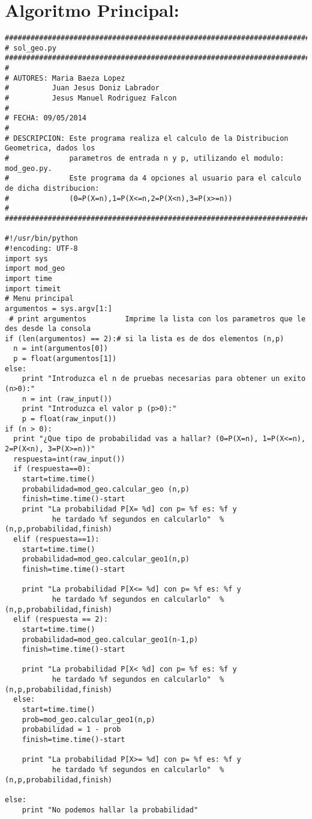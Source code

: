 \section{Algoritmo Principal:}
\label{Apendice1:XXX}

\begin{center}
\begin{footnotesize}
\begin{verbatim}
###################################################################################
# sol_geo.py
###################################################################################
#
# AUTORES: Maria Baeza Lopez
#          Juan Jesus Doniz Labrador
#          Jesus Manuel Rodriguez Falcon
#
# FECHA: 09/05/2014
#
# DESCRIPCION: Este programa realiza el calculo de la Distribucion Geometrica, dados los
#			   parametros de entrada n y p, utilizando el modulo: mod_geo.py.
#              Este programa da 4 opciones al usuario para el calculo de dicha distribucion:
#			   (0=P(X=n),1=P(X<=n,2=P(X<n),3=P(x>=n))
#
###################################################################################

#!/usr/bin/python
#!encoding: UTF-8
import sys
import mod_geo
import time
import timeit
# Menu principal
argumentos = sys.argv[1:]
 # print argumentos         Imprime la lista con los parametros que le des desde la consola
if (len(argumentos) == 2):# si la lista es de dos elementos (n,p)
  n = int(argumentos[0])
  p = float(argumentos[1])
else:
    print "Introduzca el n de pruebas necesarias para obtener un exito (n>0):"
    n = int (raw_input())
    print "Introduzca el valor p (p>0):"
    p = float(raw_input())
if (n > 0):
  print "¿Que tipo de probabilidad vas a hallar? (0=P(X=n), 1=P(X<=n), 2=P(X<n), 3=P(X>=n))"
  respuesta=int(raw_input())
  if (respuesta==0):
    start=time.time()
    probabilidad=mod_geo.calcular_geo (n,p)
    finish=time.time()-start
    print "La probabilidad P[X= %d] con p= %f es: %f y 
           he tardado %f segundos en calcularlo"  %(n,p,probabilidad,finish)
  elif (respuesta==1):
    start=time.time()
    probabilidad=mod_geo.calcular_geo1(n,p)
    finish=time.time()-start

    print "La probabilidad P[X<= %d] con p= %f es: %f y 
           he tardado %f segundos en calcularlo"  %(n,p,probabilidad,finish)
  elif (respuesta == 2):
    start=time.time()                        
    probabilidad=mod_geo.calcular_geo1(n-1,p)
    finish=time.time()-start                 

    print "La probabilidad P[X< %d] con p= %f es: %f y 
           he tardado %f segundos en calcularlo"  %(n,p,probabilidad,finish)
  else:
    start=time.time()                       
    prob=mod_geo.calcular_geo1(n,p)
    probabilidad = 1 - prob
    finish=time.time()-start                 

    print "La probabilidad P[X>= %d] con p= %f es: %f y 
           he tardado %f segundos en calcularlo"  %(n,p,probabilidad,finish)

else:
    print "No podemos hallar la probabilidad"


\end{verbatim}
\end{footnotesize}
\end{center}

